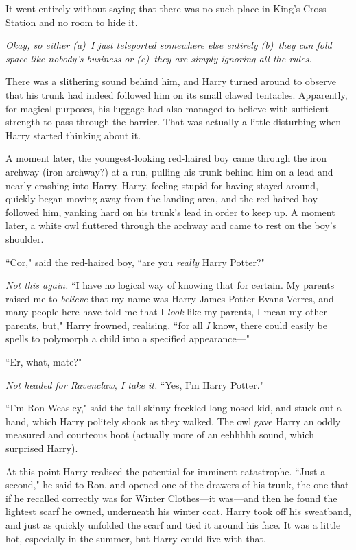 It went entirely without saying that there was no such place in King's Cross Station and no room to hide it.

\emph{Okay, so either (a)~I just teleported somewhere else entirely (b)~they can fold space like nobody's business or (c)~they are simply ignoring all the rules.}

There was a slithering sound behind him, and Harry turned around to observe that his trunk had indeed followed him on its small clawed tentacles. Apparently, for magical purposes, his luggage had also managed to believe with sufficient strength to pass through the barrier. That was actually a little disturbing when Harry started thinking about it.

A moment later, the youngest-looking red-haired boy came through the iron archway (iron archway?) at a run, pulling his trunk behind him on a lead and nearly crashing into Harry. Harry, feeling stupid for having stayed around, quickly began moving away from the landing area, and the red-haired boy followed him, yanking hard on his trunk's lead in order to keep up. A moment later, a white owl fluttered through the archway and came to rest on the boy's shoulder.

``Cor," said the red-haired boy, ``are you \emph{really} Harry Potter?"

\emph{Not this again.} ``I have no logical way of knowing that for certain. My parents raised me to \emph{believe} that my name was Harry James Potter-Evans-Verres, and many people here have told me that I \emph{look} like my parents, I mean my other parents, but," Harry frowned, realising, ``for all \emph{I} know, there could easily be spells to polymorph a child into a specified appearance—"

``Er, what, mate?"

\emph{Not headed for Ravenclaw, I take it.} ``Yes, I'm Harry Potter."

``I'm Ron Weasley," said the tall skinny freckled long-nosed kid, and stuck out a hand, which Harry politely shook as they walked. The owl gave Harry an oddly measured and courteous hoot (actually more of an eehhhhh sound, which surprised Harry).

At this point Harry realised the potential for imminent catastrophe. ``Just a second," he said to Ron, and opened one of the drawers of his trunk, the one that if he recalled correctly was for Winter Clothes—it was—and then he found the lightest scarf he owned, underneath his winter coat. Harry took off his sweatband, and just as quickly unfolded the scarf and tied it around his face. It was a little hot, especially in the summer, but Harry could live with that.

